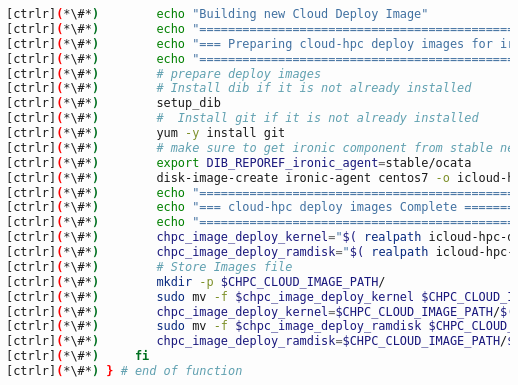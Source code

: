 \begin{lstlisting}[language=bash,keywords={}]
[ctrlr](*\#*)        echo "Building new Cloud Deploy Image"
[ctrlr](*\#*)        echo "====================================================================="
[ctrlr](*\#*)        echo "=== Preparing cloud-hpc deploy images for ironic====================="
[ctrlr](*\#*)        echo "====================================================================="
[ctrlr](*\#*)        # prepare deploy images
[ctrlr](*\#*)        # Install dib if it is not already installed
[ctrlr](*\#*)        setup_dib
[ctrlr](*\#*)        #  Install git if it is not already installed
[ctrlr](*\#*)        yum -y install git
[ctrlr](*\#*)        # make sure to get ironic component from stable newton release
[ctrlr](*\#*)        export DIB_REPOREF_ironic_agent=stable/ocata
[ctrlr](*\#*)        disk-image-create ironic-agent centos7 -o icloud-hpc-deploy-c7
[ctrlr](*\#*)        echo "====================================================================="
[ctrlr](*\#*)        echo "=== cloud-hpc deploy images Complete ================================"
[ctrlr](*\#*)        echo "====================================================================="
[ctrlr](*\#*)        chpc_image_deploy_kernel="$( realpath icloud-hpc-deploy-c7.kernel)"
[ctrlr](*\#*)        chpc_image_deploy_ramdisk="$( realpath icloud-hpc-deploy-c7.initramfs)"
[ctrlr](*\#*)        # Store Images file
[ctrlr](*\#*)        mkdir -p $CHPC_CLOUD_IMAGE_PATH/
[ctrlr](*\#*)        sudo mv -f $chpc_image_deploy_kernel $CHPC_CLOUD_IMAGE_PATH/
[ctrlr](*\#*)        chpc_image_deploy_kernel=$CHPC_CLOUD_IMAGE_PATH/$(basename $chpc_image_deploy_kernel)
[ctrlr](*\#*)        sudo mv -f $chpc_image_deploy_ramdisk $CHPC_CLOUD_IMAGE_PATH/
[ctrlr](*\#*)        chpc_image_deploy_ramdisk=$CHPC_CLOUD_IMAGE_PATH/$(basename $chpc_image_deploy_ramdisk)
[ctrlr](*\#*)     fi
[ctrlr](*\#*) } # end of function
\end{lstlisting}




